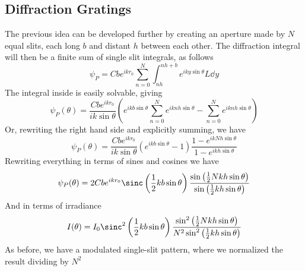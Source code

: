 \documentclass[../electromagnetism.tex]{subfiles}
\begin{document}
\subsection{Diffraction Gratings}
The previous idea can be developed further by creating an aperture made by $N$ equal slits, each long $b$ and distant $h$ between each other. The diffraction integral will then be a finite sum of single slit integrals, as follows
\begin{equation}
	\psi_P=Cbe^{ikr_0}\sum_{n=0}^N\int_{nh}^{nh+b}e^{iky\sin\theta}L\dd^{}{y}
	\label{eq:diffractiongratingint.fradiff}
\end{equation}
The integral inside is easily solvable, giving
\begin{equation*}
	\psi_P(\theta)=\frac{Cbe^{ikr_0}}{ik\sin\theta}\left( e^{ikb\sin\theta}\sum_{n=0}^Ne^{iknh\sin\theta}-\sum_{n=0}^Ne^{iknh\sin\theta} \right)
\end{equation*}
Or, rewriting the right hand side and explicitly summing, we have
\begin{equation*}
	\psi_P(\theta)=\frac{Cbe^{ikr_0}}{ik\sin\theta}\left( e^{ikb\sin\theta}-1 \right)\frac{1-e^{ikNh\sin\theta}}{1-e^{ikh\sin\theta}}
\end{equation*}
Rewriting everything in terms of sines and cosines we have
\begin{equation}
	\psi_P(\theta)=2Cbe^{ikr_0}\sinc\left( \frac{1}{2}kb\sin\theta \right)\frac{\sin\left( \frac{1}{2}Nkh\sin\theta \right)}{\sin\left( \frac{1}{2}kh\sin\theta \right)}
	\label{eq:gratingwave.fradiff}
\end{equation}
And in terms of irradiance
\begin{equation}
	I(\theta)=I_0\sinc^2\left( \frac{1}{2}kb\sin\theta \right)\frac{\sin^2\left( \frac{1}{2}Nkh\sin\theta \right)}{N^2\sin^2\left( \frac{1}{2}kh\sin\theta \right)}
	\label{eq:irradiancegrating.fradiff}
\end{equation}
As before, we have a modulated single-slit pattern, where we normalized the result dividing by $N^2$
\end{document}
